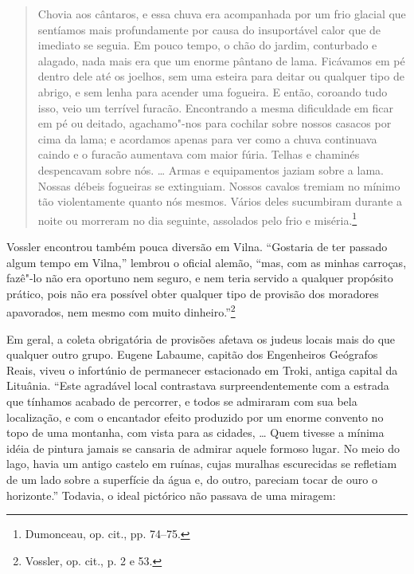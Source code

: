 \begin{quote}
Chovia aos cântaros, e essa chuva era acompanhada por um frio glacial
que sentíamos mais profundamente por causa do insuportável calor que de
imediato se seguia. Em pouco tempo, o chão do jardim, conturbado e
alagado, nada mais era que um enorme pântano de lama. Ficávamos em pé
dentro dele até os joelhos, sem uma esteira para deitar ou qualquer tipo
de abrigo, e sem lenha para acender uma fogueira. E então, coroando tudo
isso, veio um terrível furacão. Encontrando a mesma dificuldade em ficar
em pé ou deitado, agachamo"-nos para cochilar sobre nossos casacos por
cima da lama; e acordamos apenas para ver como a chuva continuava caindo
e o furacão aumentava com maior fúria. Telhas e chaminés despencavam
sobre nós. \ldots{} Armas e equipamentos jaziam sobre a lama. Nossas
débeis fogueiras se extinguiam. Nossos cavalos tremiam no mínimo tão
violentamente quanto nós mesmos. Vários deles sucumbiram durante a noite
ou morreram no dia seguinte, assolados pelo frio e miséria.\footnote{Dumonceau,
  op. cit., pp. 74--75.}
\end{quote}

Vossler encontrou também pouca diversão em Vilna. ``Gostaria de ter
passado algum tempo em Vilna,'' lembrou o oficial alemão, ``mas, com as
minhas carroças, fazê"-lo não era oportuno nem seguro, e nem teria
servido a qualquer propósito prático, pois não era possível obter
qualquer tipo de provisão dos moradores apavorados, nem mesmo com muito
dinheiro.''\footnote{Vossler, op. cit., p. 2 e 53.}

Em geral, a coleta obrigatória de provisões afetava os judeus locais
mais do que qualquer outro grupo. Eugene Labaume, capitão dos
Engenheiros Geógrafos Reais, viveu o infortúnio de permanecer
estacionado em Troki, antiga capital da Lituânia. ``Este agradável local
contrastava surpreendentemente com a estrada que tínhamos acabado de
percorrer, e todos se admiraram com sua bela localização, e com o
encantador efeito produzido por um enorme convento no topo de uma
montanha, com vista para as cidades, \ldots{} Quem tivesse a mínima
idéia de pintura jamais se cansaria de admirar aquele formoso lugar. No
meio do lago, havia um antigo castelo em ruínas, cujas muralhas
escurecidas se refletiam de um lado sobre a superfície da água e, do
outro, pareciam tocar de ouro o horizonte.'' Todavia, o ideal pictórico
não passava de uma miragem:

